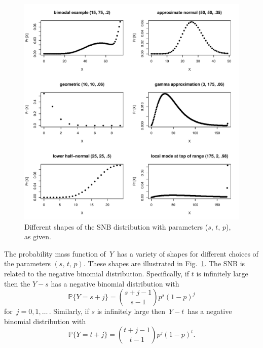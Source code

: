 \documentclass[12pt]{article}         %
\begin{document}
\begin{figure}[p!]
\begin{center}
\includegraphics[scale=.9]{shapes.pdf}
\end{center}
\caption{Different shapes of the SNB distribution with parameters ($s$, $t$, $p$), as given. \label{shapes.fig}}
\end{figure}

The probability mass function of $\,Y\,$ has a variety of shapes for different choices of the parameters $(s,\, t,\,p)$.
These shapes are illustrated in Fig.~\ref{shapes.fig}.
The SNB is related to the negative binomial distribution. Specifically, if $t$ is infinitely large then the $Y-s$ has a negative binomial distribution with
\begin{equation*}                                    %
   \mathbb{P}\{Y=s+j \}        \label{nb1.eq}
          = {{s+j-1}\choose{s-1}} p^s (1-p)^j
\end{equation*}
for $\,j=0, 1,\ldots\,$.
Similarly, if $s$ is infinitely large then $\,Y - t\,$ has a negative binomial distribution with
\begin{equation*}                                    %
    \mathbb{P}\{Y=t+j \}        \label{nb2.eq} 
               = {{t+j-1}\choose{t-1}} p^j(1-p)^t.
\end{equation*}
\end{document}
